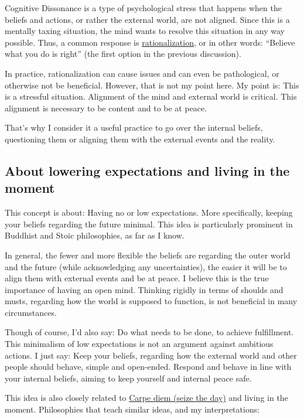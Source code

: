 \documentclass[
]{book}
\begin{document}
Cognitive Dissonance is a type of psychological stress that happens when the beliefs and actions, or rather the external world, are not aligned. Since this is a mentally taxing situation, the mind wants to resolve this situation in any way possible. Thus, a common response is \href{https://en.wikipedia.org/wiki/Rationalization_(psychology)}{rationalization}, or in other words: ``Believe what you do is right'' (the first option in the previous discussion).

In practice, rationalization can cause issues and can even be pathological, or otherwise not be beneficial. However, that is not my point here. My point is: This is a stressful situation. Alignment of the mind and external world is critical. This alignment is necessary to be content and to be at peace.

That's why I consider it a useful practice to go over the internal beliefs, questioning them or aligning them with the external events and the reality.

\hypertarget{about-lowering-expectations-and-living-in-the-moment}{%
\subsection{About lowering expectations and living in the moment}\label{about-lowering-expectations-and-living-in-the-moment}}

This concept is about: Having no or low expectations. More specifically, keeping your beliefs regarding the future minimal. This idea is particularly prominent in Buddhist and Stoic philosophies, as far as I know.

In general, the fewer and more flexible the beliefs are regarding the outer world and the future (while acknowledging any uncertainties), the easier it will be to align them with external events and be at peace. I believe this is the true importance of having an open mind. Thinking rigidly in terms of shoulds and musts, regarding how the world is supposed to function, is not beneficial in many circumstances.

Though of course, I'd also say: Do what needs to be done, to achieve fulfillment. This minimalism of low expectations is not an argument against ambitious actions. I just say: Keep your beliefs, regarding how the external world and other people should behave, simple and open-ended. Respond and behave in line with your internal beliefs, aiming to keep yourself and internal peace safe.

This idea is also closely related to \href{https://en.wikipedia.org/wiki/Carpe_diem}{Carpe diem (seize the day)} and living in the moment. Philosophies that teach similar ideas, and my interpretations:
\end{document}
